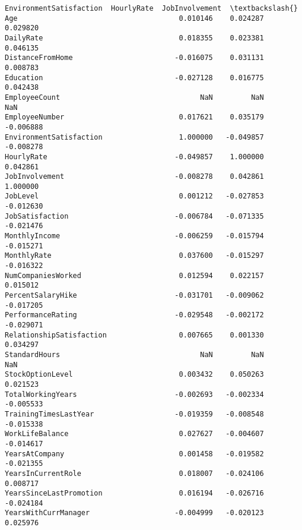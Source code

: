 \documentclass[11pt]{article}
\begin{document}
\begin{Verbatim}[commandchars=\\\{\}]
                          EnvironmentSatisfaction  HourlyRate  JobInvolvement  \textbackslash{}
Age                                      0.010146    0.024287        0.029820   
DailyRate                                0.018355    0.023381        0.046135   
DistanceFromHome                        -0.016075    0.031131        0.008783   
Education                               -0.027128    0.016775        0.042438   
EmployeeCount                                 NaN         NaN             NaN   
EmployeeNumber                           0.017621    0.035179       -0.006888   
EnvironmentSatisfaction                  1.000000   -0.049857       -0.008278   
HourlyRate                              -0.049857    1.000000        0.042861   
JobInvolvement                          -0.008278    0.042861        1.000000   
JobLevel                                 0.001212   -0.027853       -0.012630   
JobSatisfaction                         -0.006784   -0.071335       -0.021476   
MonthlyIncome                           -0.006259   -0.015794       -0.015271   
MonthlyRate                              0.037600   -0.015297       -0.016322   
NumCompaniesWorked                       0.012594    0.022157        0.015012   
PercentSalaryHike                       -0.031701   -0.009062       -0.017205   
PerformanceRating                       -0.029548   -0.002172       -0.029071   
RelationshipSatisfaction                 0.007665    0.001330        0.034297   
StandardHours                                 NaN         NaN             NaN   
StockOptionLevel                         0.003432    0.050263        0.021523   
TotalWorkingYears                       -0.002693   -0.002334       -0.005533   
TrainingTimesLastYear                   -0.019359   -0.008548       -0.015338   
WorkLifeBalance                          0.027627   -0.004607       -0.014617   
YearsAtCompany                           0.001458   -0.019582       -0.021355   
YearsInCurrentRole                       0.018007   -0.024106        0.008717   
YearsSinceLastPromotion                  0.016194   -0.026716       -0.024184   
YearsWithCurrManager                    -0.004999   -0.020123        0.025976   


\end{Verbatim}
\end{document}
